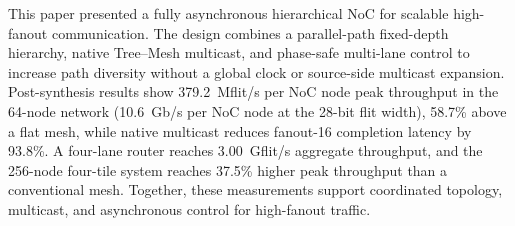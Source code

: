 \documentclass[conference]{IEEEtran}
\begin{document}
This paper presented a fully asynchronous hierarchical NoC for scalable
high-fanout communication. The design combines a parallel-path
fixed-depth hierarchy, native Tree--Mesh multicast, and phase-safe
multi-lane control to increase path diversity without a global clock or
source-side multicast expansion. Post-synthesis results show
379.2~Mflit/s per NoC node peak throughput in the 64-node network
(10.6~Gb/s per NoC node at the 28-bit flit width), 58.7\% above a flat mesh,
while native multicast
reduces fanout-16 completion latency
by 93.8\%. A four-lane router reaches 3.00~Gflit/s aggregate throughput,
and the 256-node four-tile system reaches 37.5\% higher peak throughput
than a conventional mesh. Together, these measurements support
coordinated topology, multicast, and asynchronous control for high-fanout
traffic.

{\renewcommand{\footnotesize}{\fontsize{8}{9.2}\selectfont}


}
\end{document}
